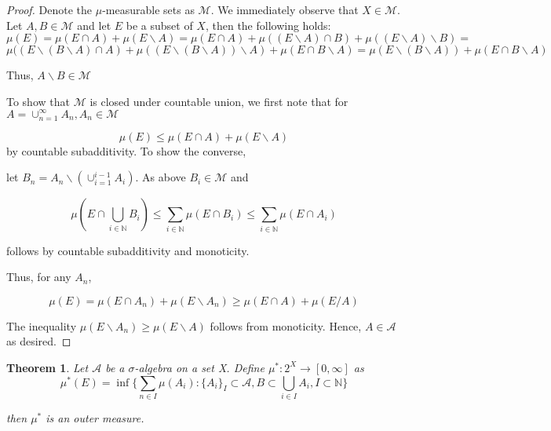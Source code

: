 \documentclass[12pt]{article}
\newtheorem{theorem}{Theorem}[section]
\theoremstyle{remark}
\begin{document}
\begin{proof}
Denote the $\mu$-measurable sets as $\mathcal{M}$. We immediately observe that $X \in \mathcal{M}$. Let $A,B \in \mathcal{M}$ and let $E$ be a subset of $X$, then the following holds:
$$ \mu(E) =  \mu(E \cap A) + \mu(E\backslash A) =  \mu(E \cap A) + \mu((E \backslash A) \cap B) + \mu((E \backslash A) \backslash B) =$$
$$ \mu((E\backslash (B \backslash A) \cap A) + \mu((E \backslash (B \backslash A)) \backslash A) + \mu(E \cap B \backslash A) = \mu(E \backslash (B \backslash A)) + \mu(E \cap B \backslash A)$$


Thus, $A \backslash B \in \mathcal{M}$

To show that $\mathcal{M}$ is closed under countable union, we first note that for $A = \cup_{n =1}^{\infty} A_n, A_n \in \mathcal{M}$

$$\mu(E) \leq \mu(E \cap A) + \mu(E \backslash A)$$
by countable subadditivity. To show the converse,

let $B_n = A_n \backslash (\cup_{i=1}^{i-1} A_i)$. As above $B_i \in \mathcal{M}$ and

$$ \mu(E \cap \bigcup_{i \in \mathbb{N}} B_i) \leq \sum_{i \in \mathbb{N}} \mu(E \cap B_i) \leq \sum_{i \in \mathbb{N}} \mu(E \cap A_i)   $$

follows by countable subadditivity and monoticity.

Thus, for any $A_n$,

$$\mu(E) = \mu(E \cap A_n) + \mu(E \backslash A_n) \geq \mu(E \cap A) + \mu(E/A) $$

The inequality $\mu(E\backslash A_n) \geq \mu(E \backslash A)$ follows from monoticity.
Hence, $A \in \mathcal{A}$ as desired.

\end{proof}

\begin{theorem} Let $\mathcal{A}$ be a $\sigma$-algebra on a set X. Define $\mu^*: 2^X \rightarrow [0,\infty]$ as
$$ \mu^*(E) = \inf\{\sum_{n \in I} \mu(A_i)  : \{{A_i}\}_{I} \subset \mathcal{A}, B \subset \bigcup_{i \in I} A_i, I \subset \mathbb{N} \}$$ 

then $\mu^*$ is an outer measure.

\end{theorem}
\end{document}
